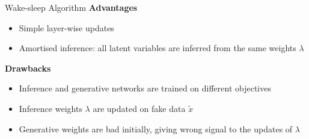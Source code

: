 \documentclass[14pt]{beamer}
\begin{document}
\begin{frame}{Wake-sleep Algorithm}
\textbf{Advantages}
\begin{itemize}
\item Simple layer-wise updates
\item Amortised inference: all latent variables are inferred from the same weights $ \lambda $
\end{itemize}
\pause
\textbf{Drawbacks}
\begin{itemize}
\item Inference and generative networks are trained on different objectives
\item Inference weights $ \lambda $ are updated on fake data $ \tilde{x} $
\item Generative weights are bad initially, giving wrong signal to the updates of $ \lambda $
\end{itemize}
\end{frame}
\end{document}
